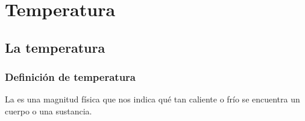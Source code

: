 \documentclass[14pt]{beamer}
\begin{document}

\section{Temperatura}
\subsection{La temperatura}

\begin{frame}
\frametitle{Definición de temperatura}
La  es una magnitud física que nos indica qué tan caliente o frío se encuentra un cuerpo o una sustancia.
\end{frame}
\end{document}
